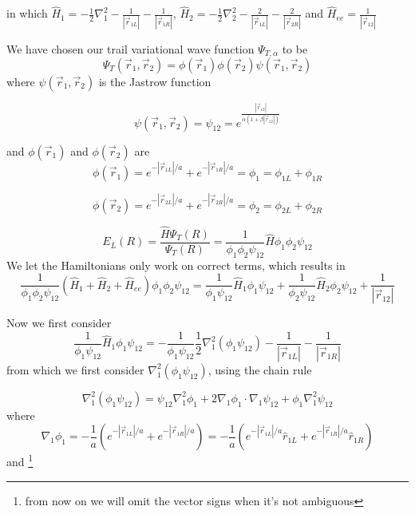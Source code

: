 \documentclass{article}
\begin{document}
in which $\hat{H}_1=-\frac{1}{2}\nabla_1^2 - \frac{1}{|\vec{r}_{1L}|} -\frac{1}{|\vec{r}_{1R}|}$, $\hat{H}_2=-\frac{1}{2}\nabla_2^2 - \frac{2}{|\vec{r}_{1L}|} -\frac{2}{|\vec{r}_{2R}|}$ and $\hat{H}_{ee}=\frac{1}{|\vec{r}_{12}|}$

We have chosen our trail variational wave function $\Psi_{T,\alpha}$ to be
\begin{equation}
 \Psi_{T}(\vec{r}_1,\vec{r}_2)=\phi(\vec{r}_1)\phi(\vec{r}_2)\psi(\vec{r}_1,\vec{r}_2)
\end{equation}
where $\psi(\vec{r}_1,\vec{r}_2)$ is the Jastrow function

\begin{equation}
\psi(\vec{r}_1,\vec{r}_2) = \psi_{12} = e^{\frac{\left| \vec{r}_{12}  \right|}{\alpha(1+\beta |\vec{r}_{12}|)} }
\end{equation}

and $\phi(\vec{r}_1)$ and $\phi(\vec{r}_2)$ are
\begin{equation}
 \phi(\vec{r}_1) = e^{-|\vec{r}_{1L}|/a} + e^{-|\vec{r}_{1R}|/a} =\phi_1= \phi_{1L} +\phi_{1R}
\end{equation}


\begin{equation}
 \phi(\vec{r}_2) = e^{-|\vec{r}_{2L}|/a} + e^{-|\vec{r}_{2R}|/a} =\phi_2 = \phi_{2L} +\phi_{2R}
\end{equation}

\begin{equation}
 E_L(R)=\frac{\hat{H}\Psi_T(R)}{\Psi_T(R)}=\frac{1}{\phi_1\phi_2\psi_{12}} \hat{H} \phi_1\phi_2\psi_{12}
\end{equation}
We let the Hamiltonians only work on correct terms, which results in
\begin{equation}
 \frac{1}{\phi_1\phi_2\psi_{12}}(\hat{H}_1 + \hat{H}_2 + \hat{H}_{ee})\phi_1\phi_2\psi_{12}=\frac{1}{\phi_1\psi_{12}}\hat{H}_1 \phi_1\psi_{12} + \frac{1}{\phi_2\psi_{12}}\hat{H}_2 \phi_2\psi_{12} + \frac{1}{|\vec{r}_{12}|}
\end{equation}

Now we first consider
\begin{equation}
 \frac{1}{\phi_1\psi_{12}}\hat{H}_1 \phi_1\psi_{12} = - \frac{1}{\phi_1\psi_{12}} \frac12 \nabla_1^2(\phi_1\psi_{12}) - \frac{1}{|\vec{r}_{1L}|} -\frac{1}{|\vec{r}_{1R}|}
\end{equation}
from which we first consider $\nabla_1^2(\phi_1\psi_{12})$, using the chain rule 

\begin{equation}
\label{master}
\nabla_1^2(\phi_1\psi_{12}) = \psi_{12}\nabla_1^2\phi_1 + 2 \nabla_1\phi_1 \cdot \nabla_1  \psi_{12} + \phi_1\nabla_1^2\psi_{12}
\end{equation}
where
\begin{equation}
\label{no1}
 \nabla_1\phi_1 =-\frac1a \left( e^{-|\vec{r}_{1L}|/a} + e^{-|\vec{r}_{1R}|/a} \right)=-\frac1a \left(  e^{-|\vec{r}_{1L}|/a}\hat{r}_{1L} +e^{-|\vec{r}_{1R}|/a}\hat{r}_{1R} \right)
\end{equation}
and \footnote{from now on we will omit the vector signs when it's not ambiguous}
\end{document}
